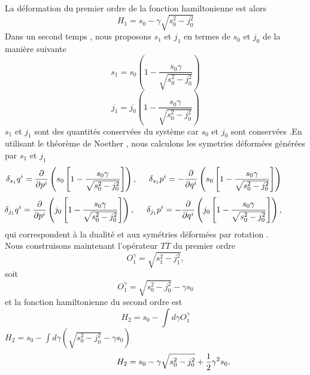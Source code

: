 \documentclass[12pt,a4paper, openany]{article}
\begin{document}
    La déformation du premier ordre de la fonction hamiltonienne est alors 
    \begin{equation}
    	H_1=s_0-\gamma\sqrt{s^2_0-j^2_0}
    \end{equation}
    Dans un second temps , nous proposons $s_1$ et $j_1$ en termes de $s_0$ et $j_0$ de la manière suivante 
    \begin{equation}
     s_1=s_0\left(1-\frac{s_0\gamma}{\sqrt{s^2_0-j^2_0}}\right)
    \end{equation}
    \begin{equation}
    j_1=j_0\left(1-\frac{s_0\gamma}{\sqrt{s^2_0-j^2_0}}\right)	
    \end{equation}
    $s_1$ et $j_1$ sont des quantités conservées du système car $s_0$ et $j_0$ sont conservées .En utilisant le théorème de Noether , nous calculons les symetries déformées générées par $s_1$ et $j_1$
    \begin{equation}
   \hspace{-1.cm} \delta_{s_1}q^i=\frac{\partial}{\partial p^i}\left(s_0\left[1-\frac{s_0\gamma}{\sqrt{s^2_0-j^2_0}}\right]\right), \hspace{0.5cm}\delta_{s_1}p^i=-\frac{\partial}{\partial q^i}\left(s_0\left[1-\frac{s_0\gamma}{\sqrt{s^2_0-j^2_0}}\right]\right)
    \end{equation}
    \begin{equation}
    \hspace{-1cm}\delta_{j_1}q^i=\frac{\partial}{\partial p^i}\left(j_0\left[1-\frac{s_0\gamma}{\sqrt{s^2_0-j^2_0}}\right]\right),\hspace{0.5cm}\delta_{j_1}p^i=-\frac{\partial}{\partial q^i}\left(j_0\left[1-\frac{s_0\gamma}{\sqrt{s^2_0-j^2_0}}\right]\right),
    \end{equation}
    qui correspondent à la dualité et aux symétries déformées par rotation .\\
    
  Nous construisons maintenant l'opérateur $T{\overline{T}}$ du premier ordre 
  \begin{equation}
  	O^{\gamma}_1=\sqrt{s^2_1-j^2_1} , 
  \end{equation}
  soit 
  \begin{equation}
  	O^{\gamma}_1=\sqrt{s^2_0-j^2_0}-{\gamma}s_0
  \end{equation} 
  et la fonction hamiltonienne du second ordre est 
  \begin{equation}
  	H_2=s_0-\int d{\gamma}	O^{\gamma}_1
  \end{equation}
 \hspace{5cm} $H_2= s_0-\int d{\gamma}\left(\sqrt{s^2_0-j^2_0}-{\gamma}s_0\right)$	\\
 \begin{equation}
 \hspace{1.5cm}	H_2=s_0-\gamma\sqrt{s^2_0-j^2_0}+\frac{1}{2}\gamma^{2}s_0 .
 \end{equation} 
 
\end{document}
